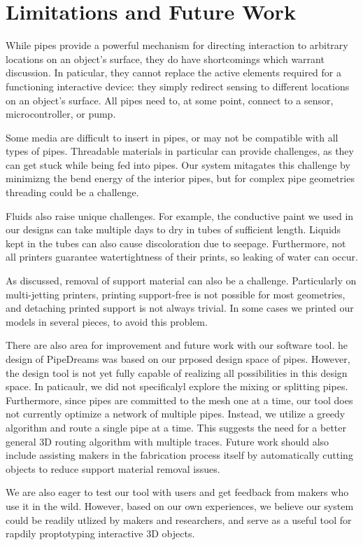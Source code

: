 \section{Limitations and Future Work}
While pipes provide a powerful mechanism for directing interaction to arbitrary locations on an object's surface, they do have shortcomings which warrant discussion.  In paticular, they cannot replace the active elements required for a functioning interactive device: they simply redirect sensing to different locations on an object's surface.  All pipes need to, at some point, connect to a sensor, microcontroller, or pump. 

Some media are difficult to insert in pipes, or may not be compatible with all types of pipes.  Threadable materials in particular can provide challenges, as they can get stuck while being fed into pipes. Our system mitagates this challenge by minimizng the bend energy of the interior pipes, but for complex pipe geometries threading could be a challenge. 

Fluids also raise unique challenges.  For example, the conductive paint we used in our designs can take multiple days to dry in tubes of sufficient length. Liquids kept in the tubes can also cause discoloration due to seepage.  Furthermore, not all printers guarantee watertightness of their prints, so leaking of water can occur.

As discussed, removal of support material can also be a challenge.  Particularly on multi-jetting printers, printing support-free is not possible for most geometries, and detaching printed support is not always trivial. In some cases we printed our models in several pieces, to avoid this problem. 

There are also area for improvement and future work with our software tool.  he design of PipeDreams was based on our prposed design space of pipes.  However, the design tool is not yet fully capable of realizing all possibilities in this design space.  In paticaulr, we did not specificalyl explore the mixing or splitting pipes.  Furthermore, since pipes are committed to the mesh one at a time, our tool does not currently optimize a network of multiple pipes. Instead, we utilize a greedy algorithm and route a single pipe at a time.  This suggests the need for a better general 3D routing algorithm with multiple traces.  Future work should also include assisting makers in the fabrication process itself by automatically cutting objects to reduce support material removal issues.  %

We are also eager to test our tool with users and get feedback from makers who use it in the wild. However, based on our own experiences, we believe our system could be readily utlized by makers and researchers, and serve as a useful tool for rapdily proptotyping interactive 3D objects.
